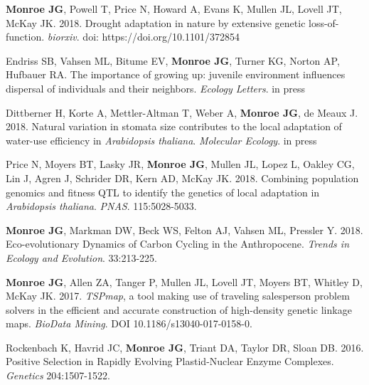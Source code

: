 \documentclass[12pt,english]{article}
\begin{document}
\begin{hangparas}{.5in}{1}

\hspace{1em} \textbf{Monroe JG}, Powell T, Price N, Howard A, Evans K, Mullen JL, Lovell JT, McKay JK. 2018. Drought adaptation in nature by extensive genetic loss-of-function. \textit{biorxiv}. doi: https://doi.org/10.1101/372854
\vspace{1ex}\par
\hspace{1em} Endriss SB, Vahsen ML, Bitume EV, \textbf{Monroe JG}, Turner KG, Norton AP, Hufbauer RA. The importance of growing up: juvenile environment influences dispersal of individuals and their neighbors. \textit{Ecology Letters}. in press
\vspace{1ex}\par
\hspace{1em} Dittberner H, Korte A, Mettler-Altman T, Weber A, \textbf{Monroe JG}, de Meaux J. 2018. Natural variation in stomata size contributes to the local adaptation of water-use efficiency in \textit{Arabidopsis thaliana}. \textit{Molecular Ecology}. in press
\vspace{1ex}\par
\hspace{1em}  Price N, Moyers BT, Lasky JR, \textbf{Monroe JG}, Mullen JL, Lopez L, Oakley CG, Lin J, Agren J, Schrider DR, Kern AD, McKay JK. 2018. Combining population genomics and fitness QTL to identify the genetics of local adaptation in \textit{Arabidopsis thaliana}. \textit{PNAS}. 115:5028-5033.
\vspace{1ex}\par
\hspace{1em}  \textbf{Monroe JG}, Markman DW, Beck WS, Felton AJ, Vahsen ML, Pressler Y. 2018. Eco-evolutionary Dynamics of Carbon Cycling in the Anthropocene. \textit{Trends in Ecology and Evolution}. 33:213-225.
\vspace{1ex}\par
\hspace{1em}  \textbf{Monroe JG}, Allen ZA, Tanger P, Mullen JL, Lovell JT, Moyers BT, Whitley D, McKay JK. 2017. \textit{TSPmap}, a tool making use of traveling salesperson problem solvers in the efficient and accurate construction of high-density genetic linkage maps. \textit{BioData Mining}. DOI 10.1186/s13040-017-0158-0.
\vspace{1ex}\par
\hspace{1em} Rockenbach K, Havrid JC, \textbf{Monroe JG}, Triant DA, Taylor DR, Sloan DB. 2016. Positive Selection in Rapidly Evolving Plastid-Nuclear Enzyme Complexes. \textit{Genetics} 204:1507-1522.

\end{hangparas}
\end{document}
